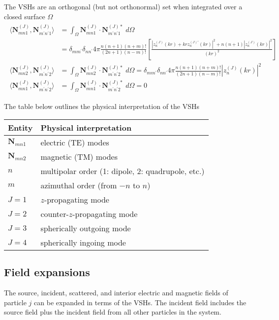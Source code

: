 \documentclass[11pt]{article}
\begin{document}
The VSHs are an orthogonal (but not orthonormal) set when integrated over a closed surface $\Omega$
\begin{align}
\begin{split}
    \langle \boldsymbol{N}_{mn1}^{(J)}, \boldsymbol{N}_{m^\prime n^\prime 1}^{(J)} \rangle
    &= \int_\Omega \boldsymbol{N}_{mn1}^{(J)} \cdot \boldsymbol{N}_{m^\prime n^\prime 1}^{(J)*} \;d\Omega \\
    &= \delta_{mm^\prime}\delta_{nn^\prime}4\pi \frac{n(n+1)(n+m)!}{(2n+1)(n-m)!}
      \left[ \frac{\left|z_n^{(J)}(kr) + krz_n^{(J)\prime}(kr)\right|^2 + n(n+1) \left|z_n^{(J)}(kr)\right|^2 }{(kr)^2} \right] \\
    \langle \boldsymbol{N}_{mn2}^{(J)}, \boldsymbol{N}_{m^\prime n^\prime 2}^{(J)} \rangle
    &= \int_\Omega \boldsymbol{N}_{mn2}^{(J)} \cdot \boldsymbol{N}_{m^\prime n^\prime 2}^{(J)*} \;d\Omega
    = \delta_{mm^\prime}\delta_{nn^\prime}4\pi \frac{n(n+1)(n+m)!}{(2n+1)(n-m)!} |z_n^{(J)}(kr)|^2 \\
    \langle \boldsymbol{N}_{mn1}^{(J)}, \boldsymbol{N}_{m^\prime n^\prime 2}^{(J)} \rangle
    &= \int_\Omega \boldsymbol{N}_{mn1}^{(J)} \cdot \boldsymbol{N}_{m^\prime n^\prime 2}^{(J)*} \;d\Omega = 0
\end{split}
\end{align}

The table below outlines the physical interpretation of the VSHs
\begin{center}
 \begin{tabular}{|l l|} 
 \hline
 \textbf{Entity} & \textbf{Physical interpretation}  \\ [0.5ex] 
 \hline\hline
 $\bm{N}_{mn1}$ & electric (TE) modes \\ 
 $\bm{N}_{mn2}$ & magnetic (TM) modes \\ 
 \hline
 $n$ & multipolar order (1: dipole, 2: quadrupole, etc.) \\
 $m$ & azimuthal order (from $-n$ to $n$) \\
 \hline
 $J=1$ & $z$-propagating mode \\ 
 $J=2$ & counter-$z$-propagating mode \\ 
 $J=3$ & spherically outgoing mode \\ 
 $J=4$ & spherically ingoing mode \\
 \hline
\end{tabular}
\end{center}

\subsection{Field expansions}
The source, incident, scattered, and interior electric and magnetic fields of particle $j$ can be expanded in terms of the VSHs.
The incident field includes the source field plus the incident field from all other particles in the system.
\newline
\end{document}
